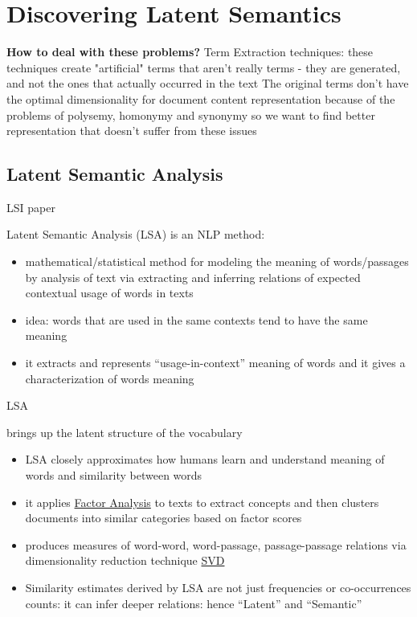 \section{Discovering Latent Semantics}


\textbf{How to deal with these problems?} Term Extraction techniques:
these techniques create "artificial" terms that aren't really terms - they are generated, and not the ones that actually occurred in the text
The original terms don't have the optimal dimensionality for document content representation
because of the problems of polysemy, homonymy and synonymy
so we want to find better representation that doesn't suffer from these issues


\subsection{Latent Semantic Analysis}

LSI paper \cite{deerwester1990indexing}


Latent Semantic Analysis (LSA) is an NLP method:

\begin{itemize}
\itemsep1pt\parskip0pt
\item
  mathematical/statistical method for modeling the meaning of
  words/passages by analysis of text via extracting and inferring
  relations of expected contextual usage of words in texts
\item
  idea: words that are used in the same contexts tend to have the same
  meaning
\item
  it extracts and represents ``usage-in-context'' meaning of words and
  it gives a characterization of words meaning
\end{itemize}

LSA


brings up the latent structure of the vocabulary

\begin{itemize}
\itemsep1pt\parskip0pt
\item
  LSA closely approximates how humans learn and understand meaning of
  words and similarity between words
\item
  it applies \href{Factor Analysis}{Factor Analysis} to texts to extract
  concepts and then clusters documents into similar categories based on
  factor scores
\item
  produces measures of word-word, word-passage, passage-passage
  relations via dimensionality reduction technique \url{SVD}
\item
  Similarity estimates derived by LSA are not just frequencies or
  co-occurrences counts: it can infer deeper relations: hence ``Latent''
  and ``Semantic''
\end{itemize}

